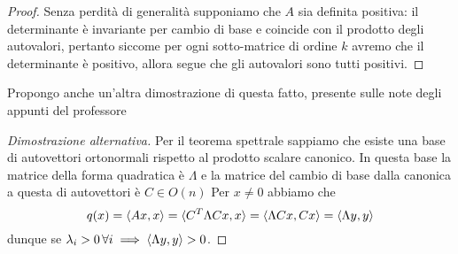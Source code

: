 \documentclass[openany, italian]{book}
\begin{document}
\begin{proof}
Senza perdità di generalità supponiamo che $A$ sia definita positiva: il determinante è invariante per cambio di base e coincide con il prodotto degli autovalori, pertanto siccome per ogni sotto-matrice di ordine $k$ avremo che il determinante è positivo, allora segue che gli autovalori sono tutti positivi.
\end{proof}
Propongo anche un'altra dimostrazione di questa fatto, presente sulle note degli appunti del professore
\begin{proof}[Dimostrazione alternativa]
Per il teorema spettrale sappiamo che esiste una base di autovettori ortonormali rispetto al prodotto scalare canonico. In questa base la matrice della forma quadratica è $\Lambda$ e la matrice del cambio di base dalla canonica a questa di autovettori è $C \in O(n)$ Per $x \neq 0$ abbiamo che
$$
q(x) = \langle Ax, x \rangle = \langle C^T \Lambda C x, x \rangle = \langle \Lambda Cx, Cx \rangle = \langle \Lambda y, y \rangle
$$
dunque se $\lambda_i > 0 \, \forall i \implies \langle \Lambda y, y \rangle > 0$.
\end{proof}
\end{document}
